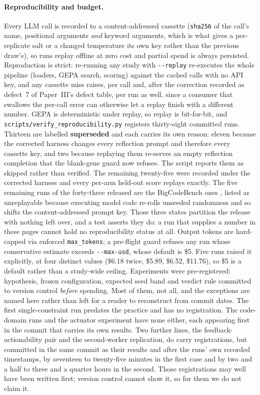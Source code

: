 \paragraph{Reproducibility and budget.}
Every LLM call is recorded to a content-addressed cassette (\texttt{sha256} of the call's name,
positional arguments \emph{and} keyword arguments, which is what gives a per-replicate salt or a
changed temperature its own key rather than the previous draw's), so
runs replay offline at zero cost and partial spend is always persisted. Reproduction is strict:
re-running any study with \texttt{-{}-replay} re-executes the whole pipeline (loaders, GEPA search,
scoring) against the cached calls with no API key, and any cassette miss raises, per call and,
after the correction recorded as defect~7 of Paper~III's defect table, per run as well, since a
consumer that swallows the per-call
error can otherwise let a replay finish with a different number. GEPA is deterministic under
replay, so replay is bit-for-bit, and \texttt{scripts/verify\_reproducibility.py}
registers thirty-eight committed runs. Thirteen are labelled \textbf{superseded} and each
carries its own reason: eleven because the corrected harness changes every reflection prompt and
therefore every cassette key, and two because replaying them re-serves an empty reflection
completion that the blank-gene guard now refuses. The script reports them as skipped rather than
verified.
The remaining twenty-five were recorded under the corrected harness and every per-arm held-out score replays
exactly. The five remaining runs of the forty-three released are the
BigCodeBench ones \citep{zhuo2024bigcodebench}, listed as unreplayable because executing model code re-rolls unseeded
randomness and so shifts the content-addressed prompt key. Those three states partition the
release with nothing left over, and a test asserts they do: a run that supplies a number in
these pages cannot hold no reproducibility status at all. Output tokens are hard-capped via enforced \texttt{max\_tokens}; a pre-flight guard
refuses any run whose conservative estimate exceeds \texttt{-{}-max-usd}, whose default is \$5.
Five runs raised it explicitly, at four distinct values (\$6.18 twice, \$5.89, \$6.52, \$11.76), so
\$5 is a default rather than a study-wide ceiling. Experiments were pre-registered: hypothesis,
frozen configuration, expected seed band and verdict rule committed to version control
\emph{before} spending. Most of them, not all, and the exceptions are named here rather than
left for a reader to reconstruct from commit dates. The first single-constraint run predates the practice and
has no registration. The code-domain runs and the actuator experiment have none either, each
appearing first in the commit that carries its own results. Two further lines, the
feedback-actionability pair and the second-worker replication, do carry registrations, but
committed in the same commit as their results and after the runs' own recorded timestamps, by
seventeen to twenty-five minutes in the first case and by two and a half to three and a quarter
hours in the second. Those registrations may well have been written first; version control cannot
show it, so for them we do not claim it.
